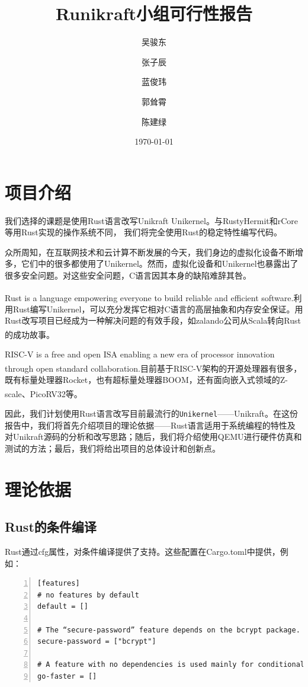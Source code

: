 \documentclass[UTF8,fontset=none,linespread=1.15]{ctexart}
\let\nosupcite\cite
\renewcommand*{\cite}[1]{\textsuperscript{\nosupcite{#1}}}
\begin{document}
\sffamily %
\title{\bfseries Runikraft小组\quad 可行性报告}
\author{吴骏东\and 张子辰\and 蓝俊玮\and 郭耸霄\and 陈建绿}
\date{\today}
\maketitle

\tableofcontents
\section{项目介绍}
我们选择的课题是使用Rust语言改写Unikraft Unikernel。与RustyHermit和rCore等用Rust实现的操作系统不同，
我们将完全使用Rust的稳定特性编写代码。

众所周知，在互联网技术和云计算不断发展的今天，我们身边的虚拟化设备不断增多，它们中的很多都使用了Unikernel。然而，虚拟化设备和Unikernel也暴露出了很多安全问题。对这些安全问题，C语言因其本身的缺陷难辞其咎。

Rust is a language empowering everyone to build reliable and efficient software.\cite{7}利用Rust编写Unikernel，可以充分发挥它相对C语言的高层抽象和内存安全保证。用Rust改写项目已经成为一种解决问题的有效手段，如zalando公司从Scala转向Rust的成功故事。\cite{3}

RISC-V is a free and open ISA enabling a new era of processor innovation through open standard collaboration.\cite{0}目前基于RISC-V架构的开源处理器有很多，既有标量处理器Rocket，也有超标量处理器BOOM，还有面向嵌入式领域的Z-scale、PicoRV32等。\cite{2}

因此，我们计划使用Rust语言改写目前最流行的\texttt{Unikernel}——Unikraft。在这份报告中，我们将首先介绍项目的理论依据——Rust语言适用于系统编程的特性及对Unikraft源码的分析和改写思路；随后，我们将介绍使用QEMU进行硬件仿真和测试的方法；最后，我们将给出项目的总体设计和创新点。
\section{理论依据}
\subsection{Rust的条件编译}
Rust通过cfg属性，对条件编译提供了支持。这些配置在Cargo.toml中提供，例如：

\begin{lstlisting}[numbers=left]
[features]
# no features by default
default = []

# The “secure-password” feature depends on the bcrypt package.
secure-password = ["bcrypt"]

# A feature with no dependencies is used mainly for conditional 	 compilation, like `#[cfg(feature = "go-faster")]`.
go-faster = []
\end{lstlisting}
\end{document}
